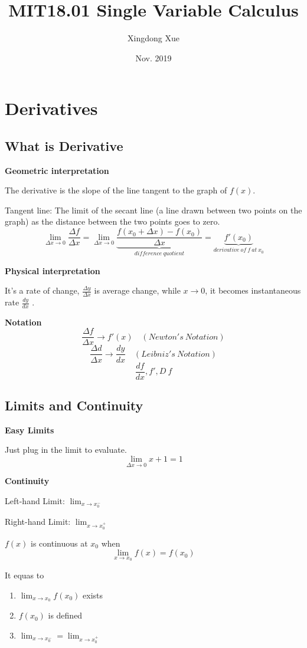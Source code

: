 \documentclass{article}
\title{MIT18.01 Single Variable Calculus}
\author{Xingdong Xue}
\date{Nov. 2019}
\newcommand\limitx[1]{\lim_{x \to #1}}
\newcommand\limitdeltaxzero{\lim_{\Delta x \to 0}}
\begin{document}
\maketitle

\section{Derivatives}
\subsection{What is Derivative}

\textbf{Geometric interpretation}

The derivative is the slope of the line tangent to the graph of $f(x)$.

Tangent line: The limit of the secant line (a line drawn between two points on the graph) as the distance between the two points goes to zero.
$$\limitdeltaxzero \frac{\Delta f}{\Delta x} = \limitdeltaxzero \underbrace{\frac{f(x_0+\Delta x)-f(x_0)}{\Delta x}}_{difference\ quotient} = \underbrace{f'(x_0)}_{derivative\ of\ f\ at\ x_0}$$

\textbf{Physical interpretation}

It's a rate of change, $\frac{\Delta y}{\Delta x}$ is average change, while $x \rightarrow 0$, it becomes instantaneous rate $\frac{dy}{dx}$ .

\textbf{Notation}
$$\frac{\Delta f}{\Delta x} \rightarrow f'(x) \quad (Newton's \  Notation)$$
$$\frac{\Delta d}{\Delta x} \rightarrow \frac{dy}{dx} \quad (Leibniz's \  Notation)$$
$$\frac{df}{dx}, f', D\ f$$

\subsection{Limits and Continuity}

\textbf{Easy Limits}

Just plug in the limit to evaluate.
$$\limitdeltaxzero x + 1 = 1$$

\textbf{Continuity}

Left-hand Limit: $\limitx{x_0^-}$

Right-hand Limit: $\limitx{x_0^+}$

$f(x)$ is continuous at $x_0$ when
$$\limitx{x_0} f(x) = f(x_0)$$

It equas to
\begin{enumerate}
\item $\limitx{x_0}f(x_0)$ exists
\item $f(x_0)$ is defined
\item $\limitx{x_0^-} = \limitx{x_0^+}$
\end{enumerate}
\end{document}
